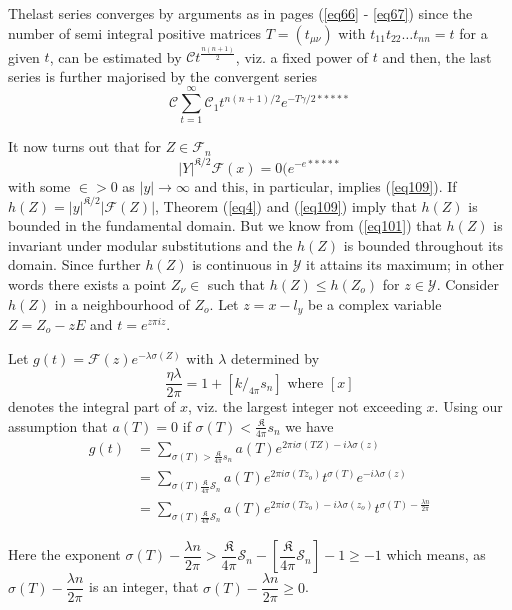 The\pageoriginale last series converges by arguments as in pages
(\ref{eq66} - \ref{eq67}) since  
the number of semi integral positive matrices $T=(t_{\mu\nu})$ with $t_{11}
t_{22} \ldots t_{nn} = t$ for a given $t$, can be estimated by
$\mathscr{C}t^{\frac{n(n + 1)}{2}}$, viz. a fixed power of $t$ and then, the
last series is further majorised by the convergent series  
$$
\mathscr{C} \sum^{\infty}_{t=1} \mathscr{C}_1 t^{n(n + 1)/2} e^{-T
  \gamma /2 *****} 
$$

It now turns out that for $Z \in \mathcal{F}_n$
\begin{equation*}
|Y|^{\mathfrak{K}/2} \mathcal{F}(x) = 0 (e^{-e*****} \tag{111}\label{eq111} 
\end{equation*}
with some $\in > 0$ as $| y | \to \infty$ and this, in particular,
implies (\ref{eq109}). If $h(Z) = | y |^{\mathfrak{K}/2}| \mathcal{F}(Z)|$,
Theorem (\ref{eq4}) and (\ref{eq109}) imply that $h(Z)$ is bounded in the
fundamental domain. But we know from (\ref{eq101}) that $h (Z)$ is invariant
under modular substitutions and the $h (Z)$ is bounded throughout its
domain. Since further $h (Z)$ is continuous in $\mathscr{Y}$ it
attains its maximum; in other words there exists a point $Z_{\nu} \in
$ such that $h(Z) \leq h(Z_o)$ for $z \in \mathscr{Y}$. Consider
$h(Z)$ in a neighbourhood of $Z_o$. Let $z = x - l_y$ be a complex
variable $Z = Z_o - z E$ and $t = e^{z \pi i z}$. 

Let $g(t) = \mathcal{F}(z) e^{- \lambda \sigma (Z)}$ with $\lambda$
determined by  
$$
\frac{\eta \lambda}{2 \pi} = 1 + [k/_{4 \pi} s_n] \text{ where } [x] 
$$
denotes the integral part of $x$, viz. the largest integer not exceeding
$x$. Using our assumption that $a(T)  = 0$ if $\sigma (T)  <
\frac{\mathfrak{K}}{4 \pi} s_n$ we have  
\begin{align*}
g(t) & = \sum_{\sigma (T) > \frac{\mathfrak{K}}{4 \pi} s_n} a (T) e^{2
  \pi i \sigma (TZ) - i \lambda \sigma (z)}\\ 
& =\sum_{\sigma (T)  \frac{\mathfrak{K}}{4 \pi} \mathcal{S}_n} a (T)
e^{2 \pi i \sigma (Tz_o)}t^{\sigma (T)}e^{- i \lambda \sigma (z)}\\ 
& =\sum_{\sigma (T)  \frac{\mathfrak{K}}{4 \pi} \mathcal{S}_n} a (T)
e^{2 \pi i \sigma (Tz_o) - i \lambda \sigma(z_o)} t^{\sigma(T) -
  \frac{\lambda n}{2 \pi}} 
\end{align*}\pageoriginale

Here the exponent $\sigma (T) - \dfrac{\lambda n}{2 \pi} >
\dfrac{\mathfrak{K}}{4 \pi} \mathcal{S}_n -[\dfrac{\mathfrak{K}}{4 \pi}
  \mathcal{S}_n]-1 \geq -1$ which means, as $\sigma(T) -
\dfrac{\lambda n}{2 \pi}$ is an integer, that $\sigma(T) -
\dfrac{\lambda n}{2 \pi} \geq 0$. 

